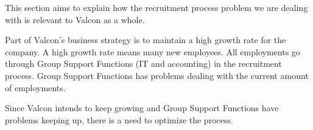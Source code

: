 This section aims to explain how the recruitment process problem we are dealing with is relevant to Valcon as a whole.\\

\noindent Part of Valcon's business strategy is to maintain a high growth rate for the company.
A high growth rate means many new employees.
All employments go through Group Support Functions (IT and accounting) in the recruitment process.
Group Support Functions has problems dealing with the current amount of employments.

Since Valcon intends to keep growing and Group Support Functions have problems keeping up, there is a need to optimize the process.